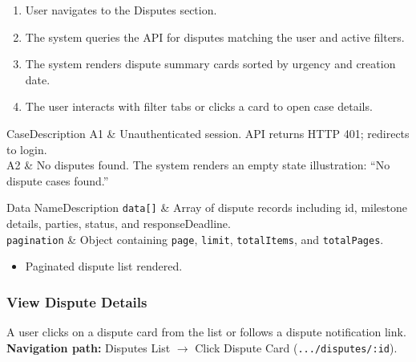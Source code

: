 \begin{enumerate}[leftmargin=1.8em,topsep=3pt,itemsep=2pt,parsep=0pt]
      \item User navigates to the Disputes section.
      \item The system queries the API for disputes matching the user and active filters.
      \item The system renders dispute summary cards sorted by urgency and creation date.
      \item The user interacts with filter tabs or clicks a card to open case details.
\end{enumerate}

\begin{flowtable}{Case}{Description}
      A1 & Unauthenticated session. API returns HTTP 401; redirects to login.\\ \hline
      A2 & No disputes found. The system renders an empty state illustration: ``No dispute cases found.''\\ \hline
\end{flowtable}

\begin{specdatatable}{Data Name}{Description}
      \texttt{data[]} & Array of dispute records including id, milestone details, parties, status, and responseDeadline.\\ \hline
      \texttt{pagination} & Object containing \texttt{page}, \texttt{limit}, \texttt{totalItems}, and \texttt{totalPages}.\\ \hline
\end{specdatatable}

\begin{itemize}[leftmargin=1.6em,topsep=3pt,itemsep=2pt,parsep=0pt,label=$\bullet$]
      \item Paginated dispute list rendered.
\end{itemize}

\subsubsection{ View Dispute Details}

A user clicks on a dispute card from the list or follows a dispute notification link.\newline
\textbf{Navigation path:} Disputes List $\rightarrow$ Click Dispute Card (\texttt{.../disputes/:id}).

